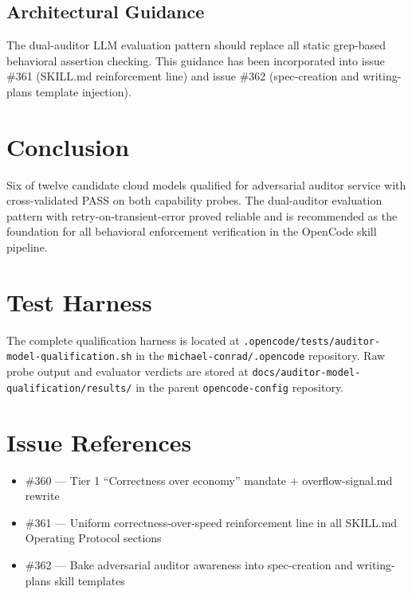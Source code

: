 \documentclass[11pt,a4paper]{article}
\begin{document}
\subsection{Architectural Guidance}

The dual-auditor LLM evaluation pattern should replace all static grep-based behavioral assertion checking. This guidance has been incorporated into issue \#361 (SKILL.md reinforcement line) and issue \#362 (spec-creation and writing-plans template injection).

\section{Conclusion}

Six of twelve candidate cloud models qualified for adversarial auditor service with cross-validated PASS on both capability probes. The dual-auditor evaluation pattern with retry-on-transient-error proved reliable and is recommended as the foundation for all behavioral enforcement verification in the OpenCode skill pipeline.

\appendix
\section{Test Harness}

The complete qualification harness is located at \texttt{.opencode/tests/auditor-model-qualification.sh} in the \texttt{michael-conrad/.opencode} repository. Raw probe output and evaluator verdicts are stored at \texttt{docs/auditor-model-qualification/results/} in the parent \texttt{opencode-config} repository.

\section{Issue References}

\begin{itemize}
  \item \#360 --- Tier 1 ``Correctness over economy'' mandate + overflow-signal.md rewrite
  \item \#361 --- Uniform correctness-over-speed reinforcement line in all SKILL.md Operating Protocol sections
  \item \#362 --- Bake adversarial auditor awareness into spec-creation and writing-plans skill templates
\end{itemize}
\end{document}
